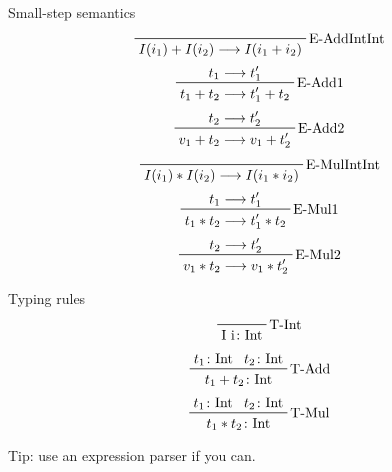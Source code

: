 \documentclass{beamer}
\begin{document}
\begin{frame}[c]
  Small-step semantics
  \begin{displaymath}  
    \prftree[r]{E-AddIntInt}
    {I (i_1) + I (i_2) \longrightarrow I (i_1 + i_2)}
  \end{displaymath}  
  \begin{displaymath}  
    \prftree[r]{E-Add1}
    {t_1 \longrightarrow t_1^{\prime}}
    {t_1 + t_2 \longrightarrow t_1^{\prime} + t_2}
  \end{displaymath}  
  \begin{displaymath}  
    \prftree[r]{E-Add2}
    {t_2 \longrightarrow t_2^{\prime}}
    {v_1 + t_2 \longrightarrow v_1 + t_2^{\prime}}
  \end{displaymath}  
  \begin{displaymath}  
    \prftree[r]{E-MulIntInt}
    {I (i_1) * I (i_2) \longrightarrow I (i_1 * i_2)}
  \end{displaymath}  
  \begin{displaymath}  
    \prftree[r]{E-Mul1}
    {t_1 \longrightarrow t_1^{\prime}}
    {t_1 * t_2 \longrightarrow t_1^{\prime} * t_2}
  \end{displaymath}  
  \begin{displaymath}  
    \prftree[r]{E-Mul2}
    {t_2 \longrightarrow t_2^{\prime}}
    {v_1 * t_2 \longrightarrow v_1 * t_2^{\prime}}
  \end{displaymath}  
\end{frame}

\begin{frame}
  Typing rules
  \begin{displaymath}  
    \prftree[r]{T-Int}
    {\text{I i} \colon \text{Int}}
  \end{displaymath}  
  \begin{displaymath}  
    \prftree[r]{T-Add}
    {t_1 \colon \text{Int}}
    {t_2 \colon \text{Int}}
    {t_1 + t_2 \colon \text{Int}}
  \end{displaymath}  
  \begin{displaymath}  
    \prftree[r]{T-Mul}
    {t_1 \colon \text{Int}}
    {t_2 \colon \text{Int}}
    {t_1 * t_2 \colon \text{Int}}
  \end{displaymath}  
\end{frame}

\begin{frame}[c]
  \begin{center}
Tip: use an expression parser if you can.
  \end{center}
\end{frame}
\end{document}
